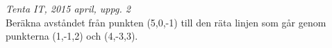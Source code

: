 {\it Tenta IT, 2015 april, uppg. 2}\\
Beräkna avståndet från punkten (5,0,-1) till den räta linjen som går genom punkterna (1,-1,2) och (4,-3,3).